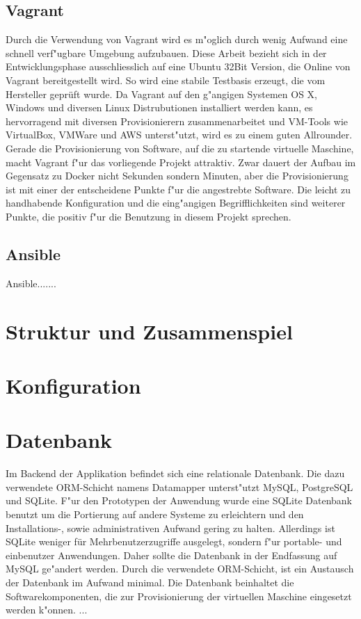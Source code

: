 \subsection{Vagrant}
Durch die Verwendung von Vagrant wird es m"oglich durch wenig Aufwand eine schnell verf"ugbare Umgebung aufzubauen.
Diese Arbeit bezieht sich in der Entwicklungsphase ausschliesslich auf eine Ubuntu 32Bit Version, die Online von Vagrant bereitgestellt wird.
So wird eine stabile Testbasis erzeugt, die vom Hersteller geprüft wurde.\newline
Da Vagrant auf den g"angigen Systemen OS X, Windows und diversen Linux Distrubutionen installiert werden kann, es hervorragend mit diversen Provisionierern zusammenarbeitet und VM-Tools wie VirtualBox, VMWare und AWS unterst"utzt, wird es zu einem guten Allrounder. \newline
Gerade die Provisionierung von Software, auf die zu startende virtuelle Maschine, macht Vagrant f"ur das vorliegende Projekt attraktiv.
Zwar dauert der Aufbau im Gegensatz zu Docker nicht Sekunden sondern Minuten, aber die Provisionierung ist mit einer der entscheidene Punkte f"ur die angestrebte Software.\newline
Die leicht zu handhabende Konfiguration und die eing"angigen Begrifflichkeiten sind weiterer Punkte, die positiv f"ur die Benutzung in diesem Projekt sprechen.


\subsection{Ansible}
 Ansible.......

\section{Struktur und Zusammenspiel}
\section{Konfiguration}
\section{Datenbank}
Im Backend der Applikation befindet sich eine relationale Datenbank. \newline
Die dazu verwendete ORM-Schicht namens Datamapper unterst"utzt MySQL, PostgreSQL und SQLite.\newline
F"ur den Prototypen der Anwendung wurde eine SQLite Datenbank benutzt um die Portierung auf andere Systeme zu erleichtern und den Installations-, sowie administrativen Aufwand gering zu halten.\newline
Allerdings ist SQLite weniger für Mehrbenutzerzugriffe ausgelegt, sondern f"ur portable- und einbenutzer Anwendungen. Daher sollte die Datenbank in der Endfassung auf MySQL ge"andert werden.\newline
Durch die verwendete ORM-Schicht, ist ein Austausch der Datenbank im Aufwand minimal.\newline
Die Datenbank beinhaltet die Softwarekomponenten, die zur Provisionierung der virtuellen Maschine eingesetzt werden k"onnen.
...

